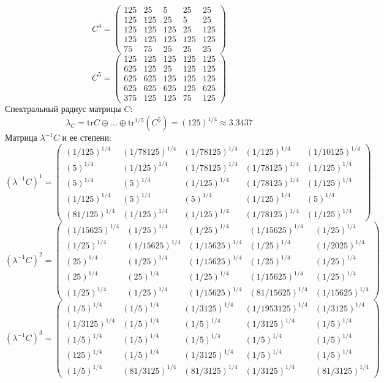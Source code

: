 $$C^4 = \begin{pmatrix}
125 & 25 & 5 & 25 & 25\\
125 & 125 & 25 & 5 & 25\\
125 & 125 & 125 & 25 & 125\\
125 & 125 & 125 & 125 & 125\\
75 & 75 & 25 & 25 & 25
\end{pmatrix}
$$
$$C^5 = \begin{pmatrix}
125 & 125 & 125 & 125 & 125\\
625 & 125 & 25 & 125 & 125\\
625 & 625 & 125 & 125 & 125\\
625 & 625 & 625 & 125 & 625\\
375 & 125 & 125 & 75 & 125
\end{pmatrix}
$$
Спектральный радиус матрицы $C$:
$$\lambda_{C} = \mathrm{tr}C\oplus \dots \oplus \mathrm{tr}^{1/5}(C^{5}) = (125)^{1/4} \approx 3.3437$$
Матрица $\lambda^{-1}C$ и ее степени:
$$(\lambda^{-1}C)^1 = \begin{pmatrix}
(1/125)^{1/4} & (1/78125)^{1/4} & (1/78125)^{1/4} & (1/125)^{1/4} & (1/10125)^{1/4}\\
(5)^{1/4} & (1/125)^{1/4} & (1/78125)^{1/4} & (1/78125)^{1/4} & (1/125)^{1/4}\\
(5)^{1/4} & (5)^{1/4} & (1/125)^{1/4} & (1/78125)^{1/4} & (1/125)^{1/4}\\
(1/125)^{1/4} & (5)^{1/4} & (5)^{1/4} & (1/125)^{1/4} & (5)^{1/4}\\
(81/125)^{1/4} & (1/125)^{1/4} & (1/125)^{1/4} & (1/78125)^{1/4} & (1/125)^{1/4}
\end{pmatrix}
$$
$$(\lambda^{-1}C)^2 = \begin{pmatrix}
(1/15625)^{1/4} & (1/25)^{1/4} & (1/25)^{1/4} & (1/15625)^{1/4} & (1/25)^{1/4}\\
(1/25)^{1/4} & (1/15625)^{1/4} & (1/15625)^{1/4} & (1/25)^{1/4} & (1/2025)^{1/4}\\
(25)^{1/4} & (1/25)^{1/4} & (1/15625)^{1/4} & (1/25)^{1/4} & (1/25)^{1/4}\\
(25)^{1/4} & (25)^{1/4} & (1/25)^{1/4} & (1/15625)^{1/4} & (1/25)^{1/4}\\
(1/25)^{1/4} & (1/25)^{1/4} & (1/15625)^{1/4} & (81/15625)^{1/4} & (1/15625)^{1/4}
\end{pmatrix}
$$
$$(\lambda^{-1}C)^3 = \begin{pmatrix}
(1/5)^{1/4} & (1/5)^{1/4} & (1/3125)^{1/4} & (1/1953125)^{1/4} & (1/3125)^{1/4}\\
(1/3125)^{1/4} & (1/5)^{1/4} & (1/5)^{1/4} & (1/3125)^{1/4} & (1/5)^{1/4}\\
(1/5)^{1/4} & (1/5)^{1/4} & (1/5)^{1/4} & (1/5)^{1/4} & (1/5)^{1/4}\\
(125)^{1/4} & (1/5)^{1/4} & (1/3125)^{1/4} & (1/5)^{1/4} & (1/5)^{1/4}\\
(1/5)^{1/4} & (81/3125)^{1/4} & (81/3125)^{1/4} & (1/3125)^{1/4} & (81/3125)^{1/4}
\end{pmatrix}
$$
